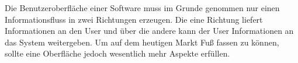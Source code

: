 Die Benutzeroberfläche einer Software muss im Grunde genommen nur einen Informationsfluss in zwei Richtungen erzeugen. Die eine Richtung liefert Informationen an den User und über die andere kann der User Informationen an das System weitergeben. Um auf dem heutigen Markt Fuß fassen zu können, sollte eine Oberfläche jedoch wesentlich mehr Aspekte erfüllen. 


